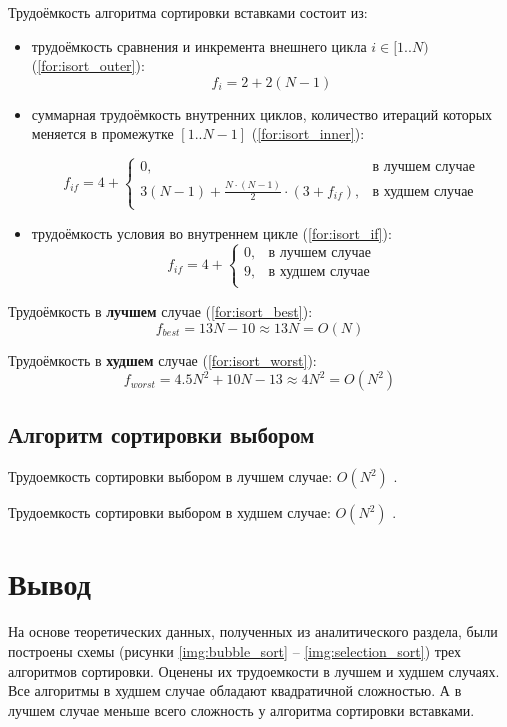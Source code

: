 Трудоёмкость алгоритма сортировки вставками состоит из:
\begin{itemize}
	\item трудоёмкость сравнения и инкремента внешнего цикла $i \in [1..N)$ (\ref{for:isort_outer}):
	\begin{equation}
	\label{for:isort_outer}
	f_{i} = 2 + 2(N - 1)
	\end{equation}
	\item суммарная трудоёмкость внутренних циклов, количество итераций которых меняется в промежутке $[1..N-1]$ (\ref{for:isort_inner}):

	\begin{equation}
	\label{for:isort_inner}
	f_{if} = 4 + \begin{cases}
		0, & \text{в лучшем случае}\\
		3(N - 1) + \frac{N \cdot (N - 1)}{2} \cdot (3 + f_{if}), & \text{в худшем случае}\\
	\end{cases}
	\end{equation}

	\item трудоёмкость условия во внутреннем цикле (\ref{for:isort_if}):
	\begin{equation}
	\label{for:isort_if}
	f_{if} = 4 + \begin{cases}
	0, & \text{в лучшем случае}\\
	9, & \text{в худшем случае}\\
	\end{cases}
	\end{equation}
\end{itemize}

Трудоёмкость в \textbf{лучшем} случае (\ref{for:isort_best}):
\begin{equation}
\label{for:isort_best}
f_{best} = 13N - 10 \approx 13N = O(N)
\end{equation}

Трудоёмкость в \textbf{худшем} случае (\ref{for:isort_worst}):
\begin{equation}
\label{for:isort_worst}
f_{worst} = 4.5N^2 + 10N - 13 \approx 4N^2 = O(N^{2})
\end{equation}

\subsection{Алгоритм сортировки выбором}

Трудоемкость сортировки выбором в лучшем случае: $O(N^2)$ \cite{knut}.

Трудоемкость сортировки выбором в худшем случае: $O(N^2)$ \cite{knut}.

\section{Вывод}

На основе теоретических данных, полученных из аналитического раздела,
были построены схемы (рисунки \ref{img:bubble_sort} -- \ref{img:selection_sort}) трех алгоритмов сортировки. Оценены их трудоемкости в лучшем и худшем случаях. Все алгоритмы в худшем случае обладают квадратичной сложностью. А в лучшем случае меньше всего сложность у алгоритма сортировки вставками.